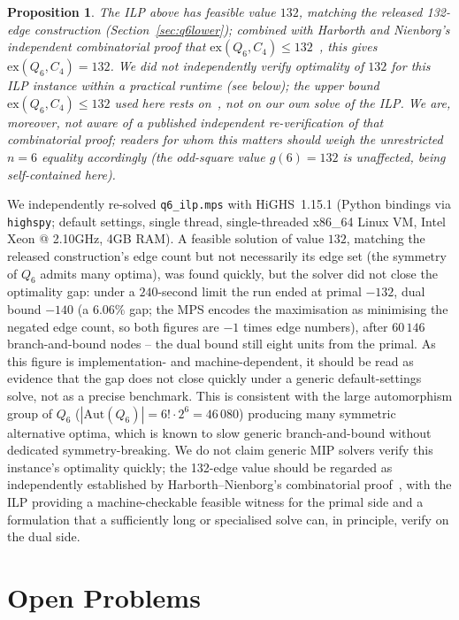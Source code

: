 \documentclass[12pt,a4paper]{article}
\newtheorem{proposition}[theorem]{Proposition}
\theoremstyle{definition}
\newcommand{\ex}{\mathrm{ex}}
\begin{document}
\begin{proposition}\label{prop:q6ilp}
The ILP above has feasible value $132$, matching the released 132-edge
construction (Section~\ref{sec:q6lower}); combined with
Harborth and Nienborg's independent combinatorial proof
that $\ex(Q_6,C_4)\le132$~\cite{HN94}, this gives $\ex(Q_6,C_4)=132$.
We did not independently verify optimality of $132$ for this ILP
instance within a practical runtime (see below); the upper bound
$\ex(Q_6,C_4)\le132$ used here rests on~\cite{HN94}, not on our own
solve of the ILP. We are, moreover, not aware of a published independent
re-verification of that combinatorial proof; readers for whom this matters
should weigh the unrestricted $n=6$ equality accordingly (the odd-square
value $g(6)=132$ is unaffected, being self-contained here).
\end{proposition}

We independently re-solved \texttt{q6\_ilp.mps} with HiGHS~1.15.1
(Python bindings via \texttt{highspy}; default settings, single thread,
single-threaded x86\_64 Linux VM, Intel Xeon @ 2.10GHz, 4GB RAM). A
feasible solution of value $132$, matching the released construction's edge
count but not necessarily its edge set (the symmetry of $Q_6$ admits many
optima), was found quickly, but the solver did not close the optimality gap:
under a $240$-second limit the run ended at primal $-132$, dual bound $-140$
(a $6.06\%$ gap; the MPS encodes the maximisation as minimising the
negated edge count, so both figures are $-1$ times edge numbers), after $60\,146$ branch-and-bound nodes -- the dual bound
still eight units from the primal.
As this figure is implementation- and
machine-dependent, it should be read as evidence that the gap does
not close quickly under a generic default-settings solve, not as a
precise benchmark. This is
consistent with the large automorphism group of $Q_6$
($|\mathrm{Aut}(Q_6)|=6!\cdot2^6=46\,080$) producing many symmetric
alternative optima, which is known to slow generic branch-and-bound
without dedicated symmetry-breaking. We do not claim generic MIP
solvers verify this instance's optimality quickly; the 132-edge value
should be regarded as independently established by
Harborth--Nienborg's combinatorial proof~\cite{HN94}, with the ILP
providing a machine-checkable feasible witness for the primal side and
a formulation that a sufficiently long or specialised solve can, in
principle, verify on the dual side.

\section{Open Problems}\label{sec:open}
\end{document}
